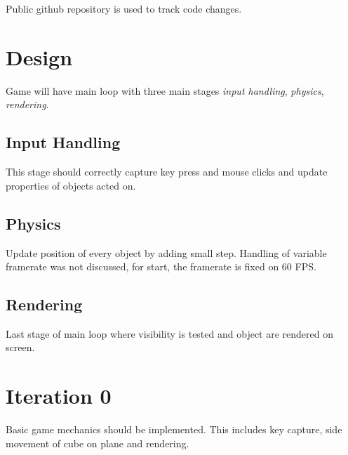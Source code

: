 \documentclass{article}
\begin{document}
Public github repository is used to track code changes.

\section{Design}
Game will have main loop with three main stages {\em input handling}, {\em physics},
{\em rendering}.

\subsection{Input Handling}
This stage should correctly capture key press and mouse clicks and update properties
of objects acted on.

\subsection{Physics}
Update position of every object by adding small step. Handling of variable framerate
was not discussed, for start, the framerate is fixed on 60 FPS.

\subsection{Rendering}
Last stage of main loop where visibility is tested and object are rendered on screen.


\section{Iteration 0}
Basic game mechanics should be implemented. This includes key capture, side movement
of cube on plane and rendering.
\end{document}
